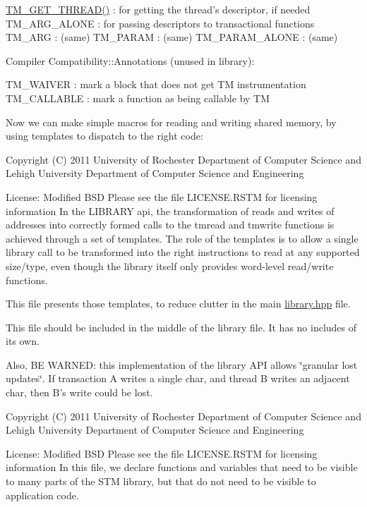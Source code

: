 \hyperlink{cxxtm_8hpp_a1ca5f081233a99e3039682fa6e3d907c}{T\-M\-\_\-\-G\-E\-T\-\_\-\-T\-H\-R\-E\-A\-D()} \-: for getting the thread's descriptor, if needed T\-M\-\_\-\-A\-R\-G\-\_\-\-A\-L\-O\-N\-E \-: for passing descriptors to transactional functions T\-M\-\_\-\-A\-R\-G \-: (same) T\-M\-\_\-\-P\-A\-R\-A\-M \-: (same) T\-M\-\_\-\-P\-A\-R\-A\-M\-\_\-\-A\-L\-O\-N\-E \-: (same)

Compiler Compatibility\-::\-Annotations (unused in library)\-:

T\-M\-\_\-\-W\-A\-I\-V\-E\-R \-: mark a block that does not get T\-M instrumentation T\-M\-\_\-\-C\-A\-L\-L\-A\-B\-L\-E \-: mark a function as being callable by T\-M

Now we can make simple macros for reading and writing shared memory, by using templates to dispatch to the right code\-:

Copyright (C) 2011 University of Rochester Department of Computer Science and Lehigh University Department of Computer Science and Engineering

License\-: Modified B\-S\-D Please see the file L\-I\-C\-E\-N\-S\-E.\-R\-S\-T\-M for licensing information In the L\-I\-B\-R\-A\-R\-Y api, the transformation of reads and writes of addresses into correctly formed calls to the tmread and tmwrite functions is achieved through a set of templates. The role of the templates is to allow a single library call to be transformed into the right instructions to read at any supported size/type, even though the library itself only provides word-\/level read/write functions.

This file presents those templates, to reduce clutter in the main \hyperlink{library_8hpp}{library.\-hpp} file.

This file should be included in the middle of the library file. It has no includes of its own.

Also, B\-E W\-A\-R\-N\-E\-D\-: this implementation of the library A\-P\-I allows \char`\"{}granular
lost updates\char`\"{}. If transaction A writes a single char, and thread B writes an adjacent char, then B's write could be lost.

Copyright (C) 2011 University of Rochester Department of Computer Science and Lehigh University Department of Computer Science and Engineering

License\-: Modified B\-S\-D Please see the file L\-I\-C\-E\-N\-S\-E.\-R\-S\-T\-M for licensing information In this file, we declare functions and variables that need to be visible to many parts of the S\-T\-M library, but that do not need to be visible to application code.


